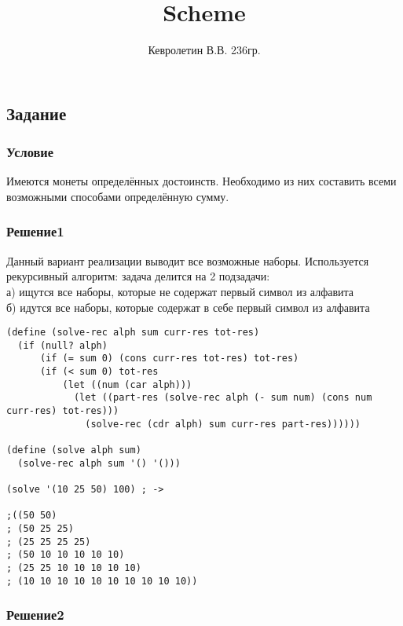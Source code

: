 \documentclass[10pt,a4paper]{article}
\author{Кевролетин В.В. 236гр.}
\title{Scheme}
\begin{document}
\maketitle

\subsection*{Задание}
\subsubsection*{Условие}
Имеются монеты определённых достоинств. Необходимо из них составить
всеми возможными способами определённую сумму.
\subsubsection*{Решение1}
Данный вариант реализации выводит все возможные наборы. Используется
рекурсивный алгоритм: задача делится на 2 подзадачи: \\
а) ищутся все наборы, которые не содержат первый символ из алфавита \\
б) идутся все наборы, которые содержат в себе первый символ из алфавита
\begin{lstlisting}
(define (solve-rec alph sum curr-res tot-res)
  (if (null? alph)
      (if (= sum 0) (cons curr-res tot-res) tot-res)
      (if (< sum 0) tot-res
          (let ((num (car alph)))
            (let ((part-res (solve-rec alph (- sum num) (cons num curr-res) tot-res)))
              (solve-rec (cdr alph) sum curr-res part-res))))))

(define (solve alph sum)
  (solve-rec alph sum '() '()))

(solve '(10 25 50) 100) ; ->

;((50 50)
; (50 25 25)
; (25 25 25 25)
; (50 10 10 10 10 10)
; (25 25 10 10 10 10 10)
; (10 10 10 10 10 10 10 10 10 10))
\end{lstlisting}

\subsubsection*{Решение2}
\end{document}

